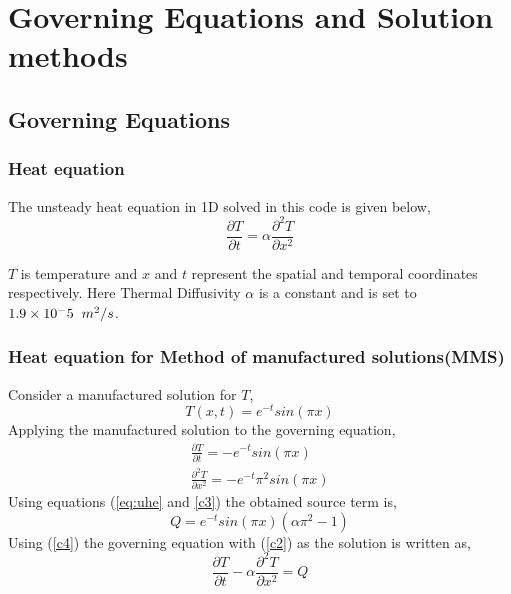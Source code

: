 
\chapter{Governing Equations and Solution methods}

\section{Governing Equations}
\subsection{Heat equation}The unsteady heat equation in 1D solved in this code is given below,
\begin{equation}\label{eq:uhe}
\frac{\partial T}{\partial t} = \alpha \frac{\partial^2 T}{\partial x^2}
\end{equation}

$T$ is temperature and $x$ and $t$ represent the spatial and temporal coordinates respectively. Here Thermal Diffusivity $\alpha$ is a constant and is set to $1.9\times 10^-5\hspace{0.2cm} m^2/s$.

\subsection{Heat equation for Method of manufactured solutions(MMS)}
Consider a manufactured solution for $T$,
\begin{equation}\label{c2}
    T(x,t)=e^{-t} sin(\pi x)
\end{equation}
Applying the manufactured solution to the governing equation,
\begin{equation}\label{c3}
\begin{gathered}
    \frac{\partial T}{\partial t}=-e^{-t} sin(\pi x)\\
    \frac{\partial^2 T}{\partial x^2}=-e^{-t} \pi^2 sin(\pi x)
\end{gathered}
\end{equation}
Using equations (\ref{eq:uhe} and \ref{c3}) the obtained source term is,
\begin{equation}\label{c4}
Q=e^{-t}sin(\pi x) (\alpha \pi^2-1)
\end{equation}
Using (\ref{c4}) the governing equation with (\ref{c2}) as the solution is written as,
\begin{equation}\label{c5}
\frac{\partial T}{\partial t}-\alpha\frac{\partial^2 T}{\partial x^2}=Q
\end{equation}







